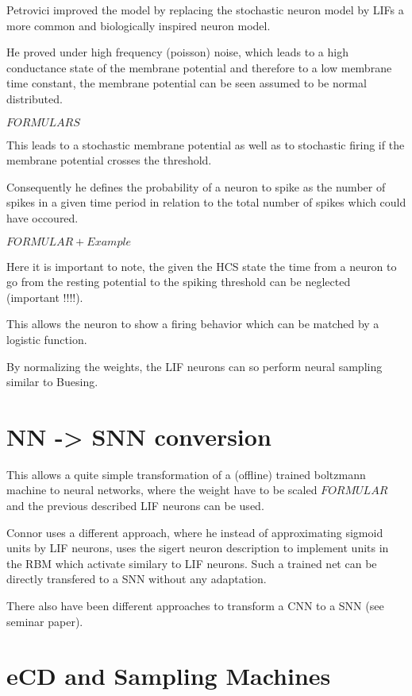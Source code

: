 Petrovici improved the model by replacing the stochastic neuron model by LIFs a more common and biologically inspired neuron model.

He proved under high frequency (poisson) noise, which leads to a high conductance state of the membrane potential and therefore to a low membrane time constant, the membrane potential can be seen assumed to be normal distributed.

$FORMULARS$

This leads to a stochastic membrane potential as well as to stochastic firing if the membrane potential crosses the threshold.

Consequently he defines the probability of a neuron to spike as the number of spikes in a given time period in relation to the total number of spikes which could have occoured. 

$FORMULAR + Example$

Here it is important to note, the given the HCS state the time from a neuron to go from the resting potential to the spiking threshold can be neglected (important !!!!).

This allows the neuron to show a firing behavior which can be matched by a logistic function.  

By normalizing the weights, the LIF neurons can so perform neural sampling similar to Buesing.


\section{NN -> SNN conversion}

This allows a quite simple transformation of a (offline) trained boltzmann machine to neural networks, where the weight have to be scaled $FORMULAR$ and the previous described LIF neurons can be used.

Connor uses a different approach, where he instead of approximating sigmoid units by LIF neurons, uses the sigert neuron description to implement units in the RBM which activate similary to LIF neurons. 
Such a trained net can be directly transfered to a SNN without any adaptation.

There also have been different approaches to transform a CNN to a SNN (see seminar paper).  


\section{eCD and Sampling Machines}

